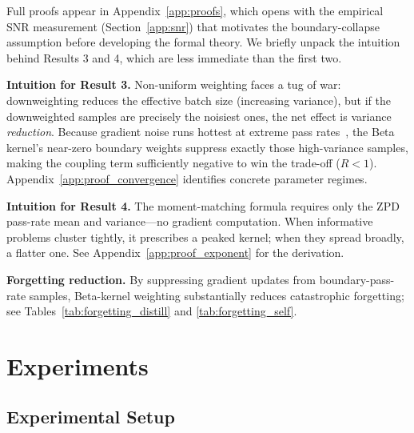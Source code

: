 \documentclass{article}
\begin{document}
Full proofs appear in Appendix~\ref{app:proofs}, which opens with the empirical SNR measurement (Section~\ref{app:snr}) that motivates the boundary-collapse assumption before developing the formal theory. We briefly unpack the intuition behind Results 3 and 4, which are less immediate than the first two.

\textbf{Intuition for Result 3.}
Non-uniform weighting faces a tug of war: downweighting reduces the effective batch size (increasing variance), but if the downweighted samples are precisely the noisiest ones, the net effect is variance \emph{reduction}. Because gradient noise runs hottest at extreme pass rates~\citep{agarwal2022vog}, the Beta kernel's near-zero boundary weights suppress exactly those high-variance samples, making the coupling term sufficiently negative to win the trade-off ($R<1$). Appendix~\ref{app:proof_convergence} identifies concrete parameter regimes.

\textbf{Intuition for Result 4.}
The moment-matching formula requires only the ZPD pass-rate mean and variance---no gradient computation. When informative problems cluster tightly, it prescribes a peaked kernel; when they spread broadly, a flatter one. See Appendix~\ref{app:proof_exponent} for the derivation.

\textbf{Forgetting reduction.}
By suppressing gradient updates from boundary-pass-rate samples, Beta-kernel weighting substantially reduces catastrophic forgetting; see Tables~\ref{tab:forgetting_distill} and \ref{tab:forgetting_self}.

\section{Experiments}
\label{sec:experiments}

\subsection{Experimental Setup}
\end{document}
